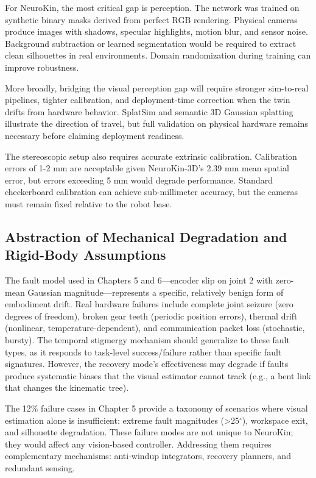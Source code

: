 ﻿\documentclass[12pt,a4paper,oneside]{report}
\begin{document}
For NeuroKin, the most critical gap is perception. The network was trained on synthetic binary masks derived from perfect RGB rendering. Physical cameras produce images with shadows, specular highlights, motion blur, and sensor noise. Background subtraction or learned segmentation would be required to extract clean silhouettes in real environments. Domain randomization during training can improve robustness.

More broadly, bridging the visual perception gap will require stronger sim-to-real pipelines, tighter calibration, and deployment-time correction when the twin drifts from hardware behavior. SplatSim \cite{qureshi2025splatsim} and semantic 3D Gaussian splatting \cite{tang2025semantic} illustrate the direction of travel, but full validation on physical hardware remains necessary before claiming deployment readiness.

The stereoscopic setup also requires accurate extrinsic calibration. Calibration errors of 1-2 mm are acceptable given NeuroKin-3D's 2.39 mm mean spatial error, but errors exceeding 5 mm would degrade performance. Standard checkerboard calibration can achieve sub-millimeter accuracy, but the cameras must remain fixed relative to the robot base.

\subsection{Abstraction of Mechanical Degradation and Rigid-Body Assumptions}

The fault model used in Chapters 5 and 6---encoder slip on joint 2 with zero-mean Gaussian magnitude---represents a specific, relatively benign form of embodiment drift. Real hardware failures include complete joint seizure (zero degrees of freedom), broken gear teeth (periodic position errors), thermal drift (nonlinear, temperature-dependent), and communication packet loss (stochastic, bursty). The temporal stigmergy mechanism should generalize to these fault types, as it responds to task-level success/failure rather than specific fault signatures. However, the recovery mode's effectiveness may degrade if faults produce systematic biases that the visual estimator cannot track (e.g., a bent link that changes the kinematic tree).

The 12\% failure cases in Chapter 5 provide a taxonomy of scenarios where visual estimation alone is insufficient: extreme fault magnitudes (>25$^\circ$), workspace exit, and silhouette degradation. These failure modes are not unique to NeuroKin; they would affect any vision-based controller. Addressing them requires complementary mechanisms: anti-windup integrators, recovery planners, and redundant sensing.
\end{document}
